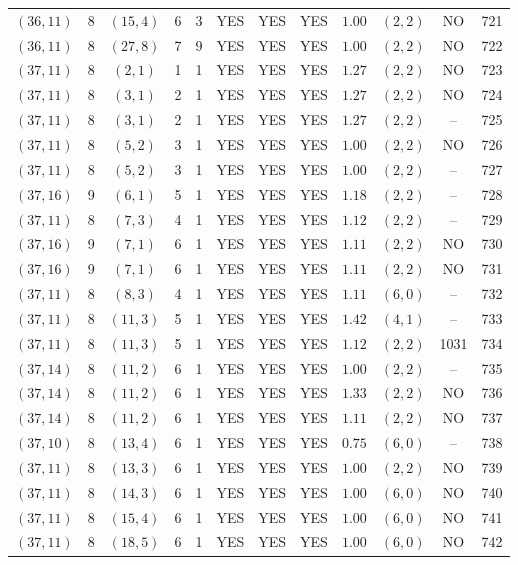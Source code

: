 \begin{longtable}{|c|c|c|c|c|c|c|c|c|c|c|c|}
$(36,11)$ & 8 & $(15,4)$ & 6 & 3 & YES & YES & YES & $1.00$ & $(2,2)$ & NO & 721\\
$(36,11)$ & 8 & $(27,8)$ & 7 & 9 & YES & YES & YES & $1.00$ & $(2,2)$ & NO & 722\\
$(37,11)$ & 8 & $(2,1)$ & 1 & 1 & YES & YES & YES & $1.27$ & $(2,2)$ & NO & 723\\
$(37,11)$ & 8 & $(3,1)$ & 2 & 1 & YES & YES & YES & $1.27$ & $(2,2)$ & NO & 724\\
$(37,11)$ & 8 & $(3,1)$ & 2 & 1 & YES & YES & YES & $1.27$ & $(2,2)$ & -- & 725\\
$(37,11)$ & 8 & $(5,2)$ & 3 & 1 & YES & YES & YES & $1.00$ & $(2,2)$ & NO & 726\\
$(37,11)$ & 8 & $(5,2)$ & 3 & 1 & YES & YES & YES & $1.00$ & $(2,2)$ & -- & 727\\
$(37,16)$ & 9 & $(6,1)$ & 5 & 1 & YES & YES & YES & $1.18$ & $(2,2)$ & -- & 728\\
$(37,11)$ & 8 & $(7,3)$ & 4 & 1 & YES & YES & YES & $1.12$ & $(2,2)$ & -- & 729\\
$(37,16)$ & 9 & $(7,1)$ & 6 & 1 & YES & YES & YES & $1.11$ & $(2,2)$ & NO & 730\\
$(37,16)$ & 9 & $(7,1)$ & 6 & 1 & YES & YES & YES & $1.11$ & $(2,2)$ & NO & 731\\
$(37,11)$ & 8 & $(8,3)$ & 4 & 1 & YES & YES & YES & $1.11$ & $(6,0)$ & -- & 732\\
$(37,11)$ & 8 & $(11,3)$ & 5 & 1 & YES & YES & YES & $1.42$ & $(4,1)$ & -- & 733\\
$(37,11)$ & 8 & $(11,3)$ & 5 & 1 & YES & YES & YES & $1.12$ & $(2,2)$ & 1031 & 734\\
$(37,14)$ & 8 & $(11,2)$ & 6 & 1 & YES & YES & YES & $1.00$ & $(2,2)$ & -- & 735\\
$(37,14)$ & 8 & $(11,2)$ & 6 & 1 & YES & YES & YES & $1.33$ & $(2,2)$ & NO & 736\\
$(37,14)$ & 8 & $(11,2)$ & 6 & 1 & YES & YES & YES & $1.11$ & $(2,2)$ & NO & 737\\
$(37,10)$ & 8 & $(13,4)$ & 6 & 1 & YES & YES & YES & $0.75$ & $(6,0)$ & -- & 738\\
$(37,11)$ & 8 & $(13,3)$ & 6 & 1 & YES & YES & YES & $1.00$ & $(2,2)$ & NO & 739\\
$(37,11)$ & 8 & $(14,3)$ & 6 & 1 & YES & YES & YES & $1.00$ & $(6,0)$ & NO & 740\\
$(37,11)$ & 8 & $(15,4)$ & 6 & 1 & YES & YES & YES & $1.00$ & $(6,0)$ & NO & 741\\
$(37,11)$ & 8 & $(18,5)$ & 6 & 1 & YES & YES & YES & $1.00$ & $(6,0)$ & NO & 742\\

\end{longtable}
